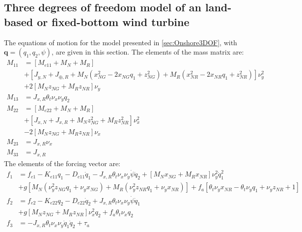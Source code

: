 \documentclass[wes, manuscript]{copernicus}
\renewcommand{\v}[1]{\boldsymbol{#1}}
\begin{document}
\subsection{Three degrees of freedom model of an land-based or fixed-bottom wind turbine}
\label{sec:Onshore3DOFEq}
The equations of motion for the model presented in \autoref{sec:Onshore3DOF}, with $\v{q}=(q_1,q_2,\psi)$, are given in this section.
The elements of the mass matrix are:
\begin{align}
    M_{11} &= \left[M_{e11}+ M_N + M_{R} \right]
        \\
       &+ \left[J_{y,N} + J_{\oplus,R} 
       + M_N\left(x_{NG}^{2} - 2 x_{NG} q_1 + z_{NG}^{2}\right)
       + M_{R} \left(x_{NR}^{2} - 2 x_{NR} q_1 + z_{NR}^{2}\right)
    \right] \nu_y^{2}
       \label{eq:GMEx1}
       \\
    &+ 2 \left[M_N z_{NG} + M_{R} z_{NR} \right]   \nu_{y} 
   \\
  M_{13} &= J_{x,R} \theta_t \nu_x \nu_y q_2
  \\
  M_{22} &= \left[M_{e22} + M_N + M_{R} \right]
  \\
         &+ \left[J_{x,N} + J_{x,R} + M_N z_{NG}^{2} + M_{R} z_{NR}^{2}\right] \nu_x^2
  \\
         & -2 \left[M_N z_{NG} + M_{R} z_{NR} \right]\nu_x
  \\
 M_{23} &= J_{x,R} \nu_x 
   \\
 M_{33} & =J_{x,R}
\end{align}
The elements of the forcing vector are:
\begin{align}
f_1 &=
   f_{e1}- K_{e11} q_1 - D_{e11} \dot{q}_1 - J_{x,R} \theta_t \nu_x \nu_y \dot{\psi} \dot{q}_2  
    + \left[M_N x_{NG} + M_{R}  x_{NR}\right] \nu_y^2 \dot{q}_1^{2}
    \\
   &+ g\left[
       M_N\left(\nu_y^{2} z_{NG} q_1 + \nu_y x_{NG}\right)
      +M_R\left(\nu_y^{2} z_{NR} q_1 + \nu_y x_{NR}\right)
           \right] 
    + f_a \left[\theta_t \nu_y x_{NR}  - \theta_t \nu_y q_1 + \nu_y z_{NR}  + 1\right]
\\ 
f_2 &=f_{e2} - K_{e22} q_2 - D_{e22} \dot{q}_2 + J_{x,R} \theta_t \nu_x \nu_y \dot{\psi} \dot{q}_1  
\\
    & +  g \left[M_N z_{NG} + M_{R} z_{NR} \right]\nu_x^{2} q_2 + f_a \theta_t \nu_x q_2
\\ 
f_3 &= - J_{x,R} \theta_t \nu_x \nu_y \dot{q}_1 \dot{q}_2 + \tau_a
\end{align}
\end{document}
